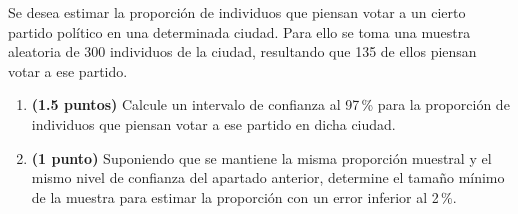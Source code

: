 
Se desea estimar la proporción de individuos que piensan votar a un cierto
partido político en una determinada ciudad. Para ello se toma una muestra
aleatoria de 300 individuos de la ciudad, resultando que 135 de ellos piensan
votar a ese partido.

\begin{enumerate}[label=\alph*)]
  \item \textbf{(1.5 puntos)} Calcule un intervalo de confianza al 97\,\% para la
  proporción de individuos que piensan votar a ese partido en dicha ciudad.
  \item \textbf{(1 punto)} Suponiendo que se mantiene la misma proporción
  muestral y el mismo nivel de confianza del apartado anterior, determine
  el tamaño mínimo de la muestra para estimar la proporción con un error
  inferior al 2\,\%.
\end{enumerate}
